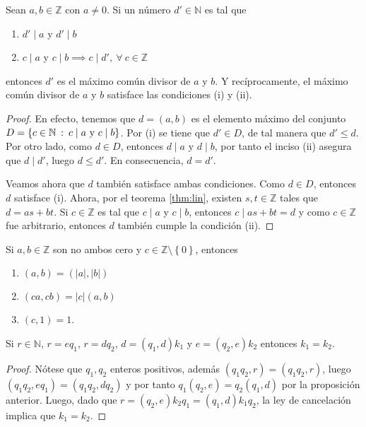 \begin{proposition}
Sean $a,b\in \mathbb{Z}$ con $a\neq 0$. Si un número $d'\in \mathbb{N}$ es tal que 

\begin{enumerate}[label=\textnormal{(\roman*)}]
	\item $d' \mid a$ y $d' \mid b$
	\item $c \mid a$ y $c \mid b \implies c \mid d',\:\forall \: c\in \mathbb{Z}$
\end{enumerate}
entonces $d'$ es el máximo común divisor de $a$ y $b$. Y recíprocamente, el máximo común divisor de $a$ y $b$ satisface las condiciones (i) y (ii).
\end{proposition}
\begin{proof}
En efecto, tenemos que $d=(a,b)$ es el elemento máximo del conjunto $D=\left\{c\in \mathbb{N} \: : \: c \mid a\textnormal{ y }c \mid b\right\}$. Por (i) se tiene que $d'\in D$, de tal manera que $d'\leq d$. Por otro lado, como $d\in D$, entonces $d \mid a$ y $d \mid b$, por tanto el inciso (ii) asegura que $d \mid d'$, luego $d\leq d'$. En consecuencia, $d=d'$.
\bigskip

Veamos ahora que $d$ también satisface ambas condiciones. Como  $d\in D$, entonces $d$ satisface (i). Ahora, por el teorema \eqref{thm:lin}, existen $s,t\in \mathbb{Z}$ tales que $d=a s+ b t$. Si $c\in \mathbb{Z}$ es tal que $c \mid a$ y $c \mid b$, entonces $c \mid a s+b t=d$ y como $c\in \mathbb{Z}$ fue arbitrario, entonces $d$ también cumple la condición (ii).
\end{proof}

\begin{proposition}
Si $a,b\in \mathbb{Z}$ son no ambos cero y $c\in \mathbb{Z}\setminus \left\{0\right\}$, entonces

\begin{enumerate}[label=\textnormal{(\roman*)}]
	\item $(a,b)=(|a|,|b|)$
	\item $(ca,cb)=|c|(a,b)$
	\item $(c,1)=1$. 
\end{enumerate}
\end{proposition}

\begin{proposition}
Si $r \in \mathbb{N}$, $r=e q_1$, $r= d q_2$, $d=(q_1,d)k_1$ y $e=(q_2,e) k_2$ entonces $k_1=k_2$.
\end{proposition}
\begin{proof}
Nótese que $q_1,q_2$ enteros positivos, además $(q_1 q_2, r) = (q_1 q_2, r)$, luego $(q_1 q_2,e q_1)=(q_1 q_2,d q_2)$ y por tanto $q_1 (q_2,e)=q_2 (q_1,d)$ por la proposición anterior. Luego, dado que $r=(q_2,e)k_2 q_1=(q_1,d)k_1 q_2$, la ley de cancelación implica que $k_1 = k_2$.
\end{proof}

